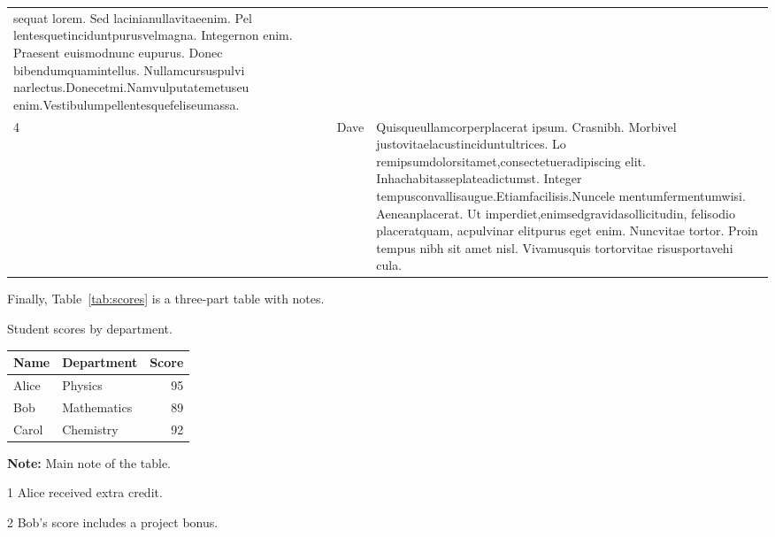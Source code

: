 \begin{center}
\begin{longtable}{|p{}|p{}|p{}|}
sequat lorem. Sed lacinianullavitaeenim. Pel
lentesquetinciduntpurusvelmagna. Integernon
 enim. Praesent euismodnunc eupurus. Donec
 bibendumquamintellus. Nullamcursuspulvi
narlectus.Donecetmi.Namvulputatemetuseu
 enim.Vestibulumpellentesquefeliseumassa. \\
4 & Dave & Quisqueullamcorperplacerat ipsum. Crasnibh.
 Morbivel justovitaelacustinciduntultrices. Lo
remipsumdolorsitamet,consectetueradipiscing
 elit. Inhachabitasseplateadictumst. Integer
 tempusconvallisaugue.Etiamfacilisis.Nuncele
mentumfermentumwisi. Aeneanplacerat. Ut
 imperdiet,enimsedgravidasollicitudin, felisodio
 placeratquam, acpulvinar elitpurus eget enim.
 Nuncvitae tortor. Proin tempus nibh sit amet
 nisl. Vivamusquis tortorvitae risusportavehi
cula. \\
\end{longtable}

Finally, Table~\ref{tab:scores} is a  three-part table with notes.

\begin{threeparttable}
\caption{Student scores by department.} \label{tab:scores}
\begin{tabular}{llr}
\toprule
\textbf{Name} & \textbf{Department} & \textbf{Score} \\
\midrule
Alice\tnote{1} & Physics & 95 \\
Bob\tnote{2} & Mathematics & 89 \\
Carol & Chemistry & 92 \\
\bottomrule
\end{tabular}
\begin{tablenotes}
\item \textbf{Note:} Main note of the table.
\small
\item[1] Alice received extra credit.
\item[2] Bob's score includes a project bonus.
\end{tablenotes}
\end{threeparttable}
\end{center}